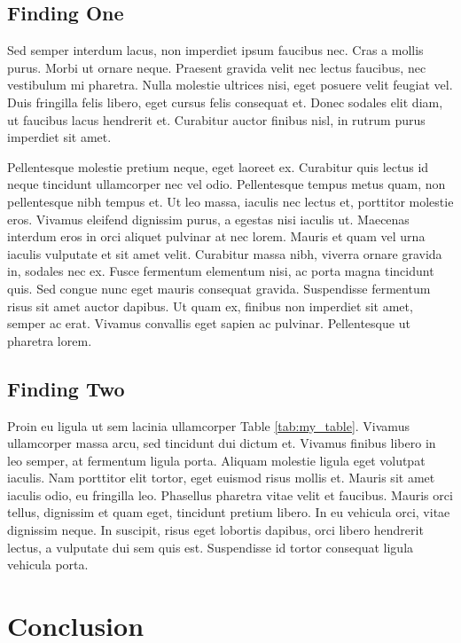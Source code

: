 \documentclass[11pt,letterpaper]{article} %
\begin{document}
\subsection{Finding One}

Sed semper interdum lacus, non imperdiet ipsum faucibus nec. Cras a mollis purus. Morbi ut ornare neque. Praesent gravida velit nec lectus faucibus, nec vestibulum mi pharetra. Nulla molestie ultrices nisi, eget posuere velit feugiat vel. Duis fringilla felis libero, eget cursus felis consequat et. Donec sodales elit diam, ut faucibus lacus hendrerit et. Curabitur auctor finibus nisl, in rutrum purus imperdiet sit amet.

Pellentesque molestie pretium neque, eget laoreet ex. Curabitur quis lectus id neque tincidunt ullamcorper nec vel odio. Pellentesque tempus metus quam, non pellentesque nibh tempus et. Ut leo massa, iaculis nec lectus et, porttitor molestie eros. Vivamus eleifend dignissim purus, a egestas nisi iaculis ut. Maecenas interdum eros in orci aliquet pulvinar at nec lorem. Mauris et quam vel urna iaculis vulputate et sit amet velit. Curabitur massa nibh, viverra ornare gravida in, sodales nec ex. Fusce fermentum elementum nisi, ac porta magna tincidunt quis. Sed congue nunc eget mauris consequat gravida. Suspendisse fermentum risus sit amet auctor dapibus. Ut quam ex, finibus non imperdiet sit amet, semper ac erat. Vivamus convallis eget sapien ac pulvinar. Pellentesque ut pharetra lorem.

\subsection{Finding Two}

Proin eu ligula ut sem lacinia ullamcorper Table \ref{tab:my_table}. Vivamus ullamcorper massa arcu, sed tincidunt dui dictum et. Vivamus finibus libero in leo semper, at fermentum ligula porta. Aliquam molestie ligula eget volutpat iaculis. Nam porttitor elit tortor, eget euismod risus mollis et. Mauris sit amet iaculis odio, eu fringilla leo. Phasellus pharetra vitae velit et faucibus. Mauris orci tellus, dignissim et quam eget, tincidunt pretium libero. In eu vehicula orci, vitae dignissim neque. In suscipit, risus eget lobortis dapibus, orci libero hendrerit lectus, a vulputate dui sem quis est. Suspendisse id tortor consequat ligula vehicula porta.

\section{Conclusion}
\end{document}
